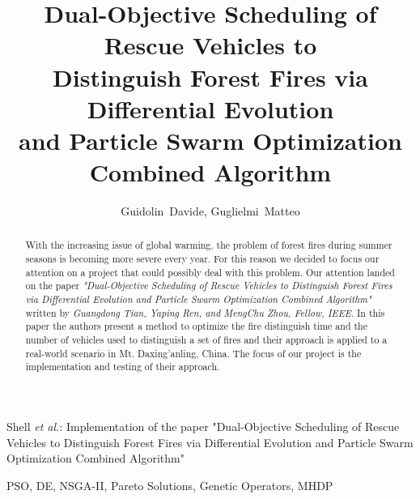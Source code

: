 \documentclass[journal]{IEEEtran}
\begin{document}
\lipsum[1] %

\title{Dual-Objective Scheduling of Rescue Vehicles to\\
Distinguish Forest Fires via Differential Evolution\\
and Particle Swarm Optimization\\
Combined Algorithm}

\author{Guidolin~Davide,
        Guglielmi~Matteo}%

%
{Shell \MakeLowercase{\textit{et al.}}: Implementation of the paper "Dual-Objective Scheduling of Rescue Vehicles to 
Distinguish Forest Fires via Differential Evolution
and Particle Swarm Optimization
Combined Algorithm"}
\maketitle

\begin{abstract}
With the increasing issue of global warming, the problem of forest fires during summer seasons is becoming more severe every year.
For this reason we decided to focus our attention on a project that could possibly deal with this problem. Our attention landed on the paper 
\textit{"Dual-Objective Scheduling of Rescue Vehicles to Distinguish Forest Fires via Differential Evolution and Particle Swarm Optimization Combined Algorithm"}
written by \textit{Guangdong Tian, Yaping Ren, and MengChu Zhou, Fellow, IEEE}. 
In this paper the authors present a method to optimize the fire distinguish time and the number of vehicles used to distinguish a set of fires and their approach is applied to a real-world scenario in Mt. Daxing’anling, China.
The focus of our project is the implementation and testing of their approach.
\end{abstract}

\begin{IEEEkeywords}
    PSO, DE, NSGA-II, Pareto Solutions, Genetic Operators, MHDP
\end{IEEEkeywords}

\IEEEpeerreviewmaketitle









\end{document}
